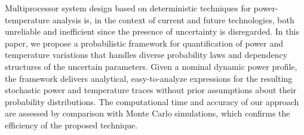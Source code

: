 Multiprocessor system design based on deterministic techniques for power-temperature analysis is, in the context of current and future technologies, both unreliable and inefficient since the presence of uncertainty is disregarded. In this paper, we propose a probabilistic framework for quantification of power and temperature variations that handles diverse probability laws and dependency structures of the uncertain parameters. Given a nominal dynamic power profile, the framework delivers analytical, easy-to-analyze expressions for the resulting stochastic power and temperature traces without prior assumptions about their probability distributions. The computational time and accuracy of our approach are assessed by comparison with Monte Carlo simulations, which confirms the efficiency of the proposed technique.
